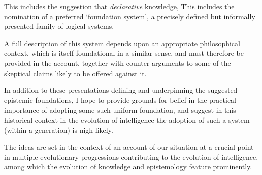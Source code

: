 This includes the suggestion that \emph{declarative} knowledge, 
This includes the nomination of a preferred `foundation system', a precisely defined but informally presented family of logical systems.

A full description of this system depends upon an appropriate philosophical context, which is itself foundational in a similar sense, and must therefore be provided in the account, together with counter-arguments to some of the skeptical claims likely to be offered against it.

In addition to these presentations defining and underpinning the suggested epistemic foundations, I hope to provide grounds for belief in the practical importance of adopting some such uniform foundation, and suggest in this historical context in the evolution of intelligence the adoption of such a system (within a generation) is nigh likely.

The ideas are set in the context of an account of our situation at a crucial point in multiple evolutionary progressions contributing to the evolution of intelligence, among which the evolution of knowledge and epistemology feature prominently.



